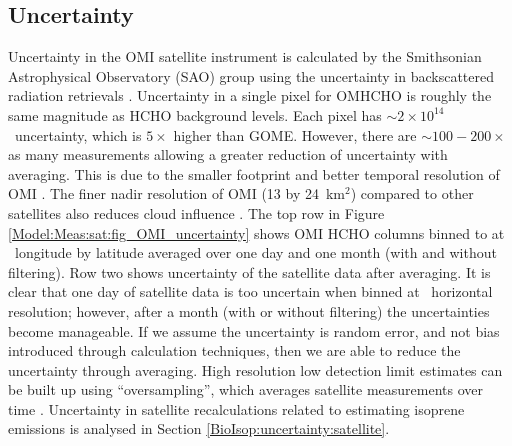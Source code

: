   \subsection{Uncertainty}
    Uncertainty in the OMI satellite instrument is calculated by the Smithsonian Astrophysical Observatory (SAO) group using the uncertainty in backscattered radiation retrievals \parencite{Abad2015, Abad2016}.
    Uncertainty in a single pixel for OMHCHO is roughly the same magnitude as HCHO background levels.
    Each pixel has $\sim 2 \times 10^{14}$\moleccm ~uncertainty, which is $5 \times$ higher than GOME.
    However, there are $\sim 100-200 \times $ as many measurements allowing a greater reduction of uncertainty with averaging.
    This is due to the smaller footprint and better temporal resolution of OMI \parencite{Chance2002,Millet2008}.
    The finer nadir resolution of OMI (13 by 24~km${^2}$) compared to other satellites also reduces cloud influence \parencite{Millet2006, Millet2008}.
    The top row in Figure \ref{Model:Meas:sat:fig_OMI_uncertainty} shows OMI HCHO columns binned to at \highhr ~longitude by latitude averaged over one day and one month (with and without filtering).
    Row two shows uncertainty of the satellite data after averaging.
    It is clear that one day of satellite data is too uncertain when binned at \highhr ~horizontal resolution; however, after a month (with or without filtering) the uncertainties become manageable.
    If we assume the uncertainty is random error, and not bias introduced through calculation techniques, then we are able to reduce the uncertainty through averaging.
    High resolution low detection limit estimates can be built up using ``oversampling'', which averages satellite measurements over time \parencite[e.g.,][]{Zhu2014}.
    Uncertainty in satellite recalculations related to estimating isoprene emissions is analysed in Section \ref{BioIsop:uncertainty:satellite}.
    
    
